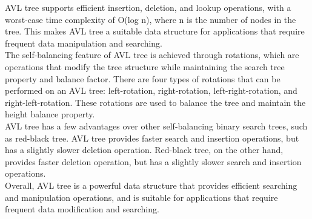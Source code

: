 \documentclass{article}
\begin{document}
AVL tree supports efficient insertion, deletion, and lookup operations, with a worst-case time complexity of O(log n), where n is the number of nodes in the tree. This makes AVL tree a suitable data structure for applications that require frequent data manipulation and searching.\\

The self-balancing feature of AVL tree is achieved through rotations, which are operations that modify the tree structure while maintaining the search tree property and balance factor. There are four types of rotations that can be performed on an AVL tree: left-rotation, right-rotation, left-right-rotation, and right-left-rotation. These rotations are used to balance the tree and maintain the height balance property.\\

AVL tree has a few advantages over other self-balancing binary search trees, such as red-black tree. AVL tree provides faster search and insertion operations, but has a slightly slower deletion operation. Red-black tree, on the other hand, provides faster deletion operation, but has a slightly slower search and insertion operations.\\

Overall, AVL tree is a powerful data structure that provides efficient searching and manipulation operations, and is suitable for applications that require frequent data modification and searching.
\end{document}
